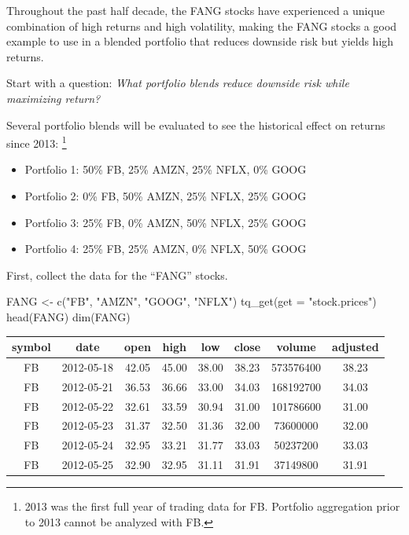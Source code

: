 Throughout the past half decade, the FANG stocks have experienced a
unique combination of high returns and high volatility, making the FANG
stocks a good example to use in a blended portfolio that reduces
downside risk but yields high returns.

Start with a question: \emph{What portfolio blends reduce downside risk
while maximizing return?}

Several portfolio blends will be evaluated to see the historical effect
on returns since 2013:
\footnote{2013 was the first full year of trading data for FB. Portfolio aggregation prior to 2013 cannot be analyzed with FB.}

\begin{itemize}
\tightlist
\item
  Portfolio 1: 50\% FB, 25\% AMZN, 25\% NFLX, 0\% GOOG
\item
  Portfolio 2: 0\% FB, 50\% AMZN, 25\% NFLX, 25\% GOOG
\item
  Portfolio 3: 25\% FB, 0\% AMZN, 50\% NFLX, 25\% GOOG
\item
  Portfolio 4: 25\% FB, 25\% AMZN, 0\% NFLX, 50\% GOOG
\end{itemize}

First, collect the data for the ``FANG'' stocks.

\begin{Schunk}
\begin{Sinput}
FANG <- c("FB", "AMZN", "GOOG", "NFLX") %
    tq_get(get = "stock.prices")
head(FANG)
dim(FANG)
\end{Sinput}
\end{Schunk}

\begin{tabular}{cccccccc}
\toprule
symbol & date & open & high & low & close & volume & adjusted\\
\midrule
FB & 2012-05-18 & 42.05 & 45.00 & 38.00 & 38.23 & 573576400 & 38.23\\
FB & 2012-05-21 & 36.53 & 36.66 & 33.00 & 34.03 & 168192700 & 34.03\\
FB & 2012-05-22 & 32.61 & 33.59 & 30.94 & 31.00 & 101786600 & 31.00\\
FB & 2012-05-23 & 31.37 & 32.50 & 31.36 & 32.00 & 73600000 & 32.00\\
FB & 2012-05-24 & 32.95 & 33.21 & 31.77 & 33.03 & 50237200 & 33.03\\
FB & 2012-05-25 & 32.90 & 32.95 & 31.11 & 31.91 & 37149800 & 31.91\\
\bottomrule
\end{tabular}

